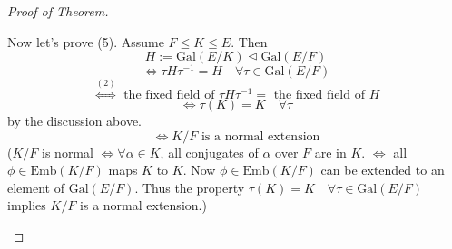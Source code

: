 \documentclass{article}
\theoremstyle{definition}
\newenvironment{proofs}[1][\proofname]{%
  \begin{proof}[#1]$ $\par\nobreak\ignorespaces
}{%
  \end{proof}
}
\newcommand{\Lra}{\Leftrightarrow}
\begin{document}
\begin{proofs}[Proof of Theorem]
\begin{enumerate}
			Now let's prove (5).
			Assume $F \leq K \leq E$.
			Then 
			\[
				H := \text{Gal}(E/K) \trianglelefteq \text{Gal}(E/F)
			\]
			\[
				\Lra \tau H \tau^{-1} = H \quad \forall \tau \in \text{Gal}(E/F)
			\]
			\[
				\stackrel{(2)}{\Lra} \text{ the fixed field of } \tau H \tau^{-1} = \text{ the fixed field of }H
			\]
			\[
				\Lra \tau(K) = K \quad \forall \tau
			\]
			by the discussion above.
			\[
				\Lra K/F \text{ is a normal extension}
			\]
			($K/F$ is normal $\Lra \forall \alpha \in K$, all conjugates of $\alpha$ over $F$ are in $K$.
			$\Lra$ all $\phi \in \text{Emb}(K/F)$ maps $K$ to $K$.
			Now $\phi \in \text{Emb}(K/F)$ can be extended to an element of $\text{Gal}(E/F)$.
			Thus the property $\tau(K) = K \quad \forall \tau \in \text{Gal}(E/F)$ implies $K/F$ is a normal extension.)
	\end{enumerate}
\end{proofs}
\end{document}
